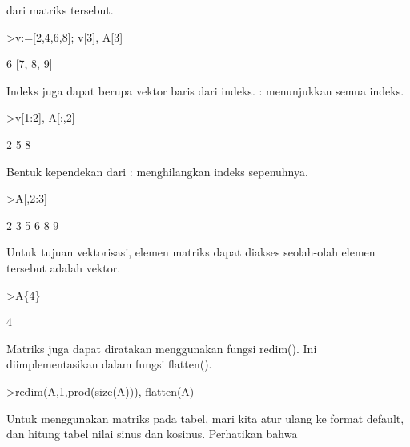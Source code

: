 \begin{eulernotebook}
\begin{eulercomment}
\begin{eulercomment}
\begin{eulercomment}
dari matriks tersebut.
\end{eulercomment}
\begin{eulerprompt}
>v:=[2,4,6,8]; v[3], A[3]
\end{eulerprompt}
\begin{euleroutput}
  6
  [7,  8,  9]
\end{euleroutput}
\begin{eulercomment}
Indeks juga dapat berupa vektor baris dari indeks. : menunjukkan semua
indeks.
\end{eulercomment}
\begin{eulerprompt}
>v[1:2], A[:,2]
\end{eulerprompt}
\begin{euleroutput}
  [2,  4]
              2 
              5 
              8 
\end{euleroutput}
\begin{eulercomment}
Bentuk kependekan dari : menghilangkan indeks sepenuhnya.
\end{eulercomment}
\begin{eulerprompt}
>A[,2:3]
\end{eulerprompt}
\begin{euleroutput}
              2             3 
              5             6 
              8             9 
\end{euleroutput}
\begin{eulercomment}
Untuk tujuan vektorisasi, elemen matriks dapat diakses seolah-olah
elemen tersebut adalah vektor.
\end{eulercomment}
\begin{eulerprompt}
>A\{4\}
\end{eulerprompt}
\begin{euleroutput}
  4
\end{euleroutput}
\begin{eulercomment}
Matriks juga dapat diratakan menggunakan fungsi redim(). Ini
diimplementasikan dalam fungsi flatten().
\end{eulercomment}
\begin{eulerprompt}
>redim(A,1,prod(size(A))), flatten(A)
\end{eulerprompt}
\begin{euleroutput}
  [1,  2,  3,  4,  5,  6,  7,  8,  9]
  [1,  2,  3,  4,  5,  6,  7,  8,  9]
\end{euleroutput}
\begin{eulercomment}
Untuk menggunakan matriks pada tabel, mari kita atur ulang ke format
default, dan hitung tabel nilai sinus dan kosinus. Perhatikan bahwa

\end{eulercomment}
\end{eulercomment}
\end{eulercomment}
\end{eulernotebook}
